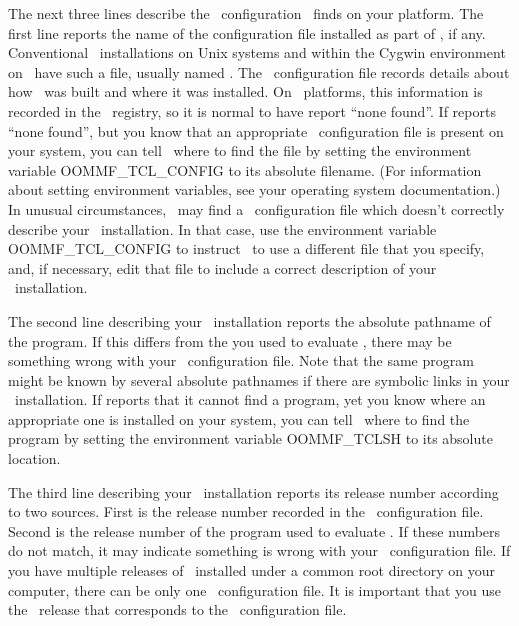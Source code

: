 The next three lines describe the \Tcl\ configuration \OOMMF\ finds
on your platform.  The first line reports the name of the configuration
file installed as part of \Tcl, if any.  Conventional \Tcl\ installations
on Unix systems and within the 
Cygwin environment
on \Windows\ have such
a file, usually named .  The \Tcl\ configuration
file records details about how \Tcl\ was built
and where it was installed.  On \Windows\ platforms, this information
is recorded in the 
\Windows\ registry, 
so it is normal to have
 report ``none found''.  If 
reports ``none found'', but you know that an appropriate \Tcl\ configuration
file is present on your system, you can tell \OOMMF\ where to find
the file by setting the environment variable 
OOMMF\_TCL\_CONFIG to
its absolute filename.  (For information about setting environment
variables, see your operating system documentation.)
In unusual circumstances, \OOMMF\ may
find a \Tcl\ configuration file which doesn't correctly describe
your \Tcl\ installation.  In that case, use the environment variable
OOMMF\_TCL\_CONFIG to instruct \OOMMF\ to use a different file that
you specify, and, if necessary, edit that file to include a correct
description of your \Tcl\ installation.

The second line describing your
\Tcl\ installation reports the absolute pathname of the 
program.  If this differs from the  you used to evaluate
, there may be something wrong with your
\Tcl\ configuration file.  Note that the same  program
might be known by several absolute pathnames if there are symbolic
links in your \Tcl\ installation.  If  reports
that it cannot find a  program, yet you know where an
appropriate one is installed on your system, you can tell \OOMMF\ where
to find the  program by setting the environment variable
OOMMF\_TCLSH
to its absolute location.

The third line describing your
\Tcl\ installation reports its release number according to two
sources.  First is the release number recorded in the \Tcl\ configuration
file.  Second is the release number of the  program used
to evaluate .  If these numbers do not match,
it may indicate something is wrong with your \Tcl\ configuration file.
If you have multiple releases of \Tcl\ installed under a common
root directory on your computer, there can be only one \Tcl\ configuration
file.  It is important that you use the \Tcl\ release that corresponds
to the \Tcl\ configuration file.

